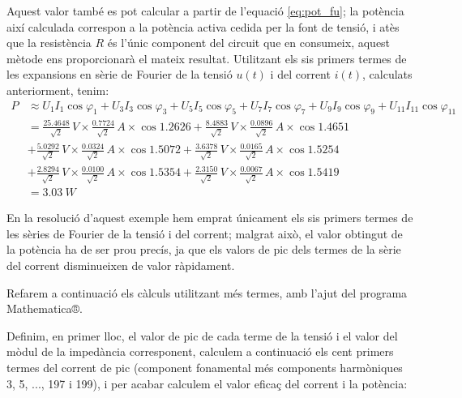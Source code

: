 \begin{exemple}
    Aquest valor també es pot calcular a partir de l'equació
    \eqref{eq:pot_fu}; la potència així calculada correspon a la
    potència activa cedida per la font de tensió, i atès que la
    resistència $R$ és l'únic component del circuit que en consumeix,
    aquest mètode ens proporcionarà el mateix resultat. Utilitzant els sis primers termes  de les
    expansions en sèrie de Fourier de la tensió $u(t)$ i del corrent
    $i(t)$, calculats anteriorment, tenim:
    \[\begin{split}
        P &\approx U_1 I_1 \cos\varphi_1 +  U_3 I_3 \cos\varphi_3 +
         U_5 I_5 \cos\varphi_5 + U_7 I_7 \cos\varphi_7 +
         U_9 I_9 \cos\varphi_9 + U_{11} I_{11} \cos\varphi_{11} \\[0.7ex]
        &= \frac{\num{25,4648}}{\sqrt{2}}\unit{\,V} \times
        \frac{\num{0,7724}}{\sqrt{2}}\unit{\,A} \times \cos \num{1,2626} +
        \frac{\num{8,4883}}{\sqrt{2}}\unit{\,V} \times
        \frac{\num{0,0896}}{\sqrt{2}}\unit{\,A} \times \cos \num{1,4651}  \\[0.7ex]
        &+ \frac{\num{5,0292}}{\sqrt{2}}\unit{\,V} \times
        \frac{\num{0,0324}}{\sqrt{2}}\unit{\,A} \times \cos \num{1,5072} +
        \frac{\num{3,6378}}{\sqrt{2}}\unit{\,V} \times
        \frac{\num{0,0165}}{\sqrt{2}}\unit{\,A} \times \cos \num{1,5254} \\[0.7ex]
        &+ \frac{\num{2,8294}}{\sqrt{2}}\unit{\,V} \times
        \frac{\num{0,0100}}{\sqrt{2}}\unit{\,A} \times \cos \num{1,5354} +
        \frac{\num{2,3150}}{\sqrt{2}}\unit{\,V} \times
        \frac{\num{0,0067}}{\sqrt{2}}\unit{\,A} \times \cos \num{1,5419}\\[0.7ex]
        &= \qty{3,03}{W}
    \end{split}\]

    En la resolució d'aquest exemple hem emprat únicament els sis
    primers termes de les sèries de Fourier de la tensió i del corrent;
    malgrat això, el valor  obtingut de la potència ha de ser prou precís, ja que
    els valors de pic dels termes de la sèrie del corrent disminueixen de
    valor ràpidament.

    Refarem a continuació els càlculs utilitzant més termes, amb l'ajut
    del programa
    Mathematica®.   

    Definim, en primer lloc, el valor de pic de cada
     terme de la tensió i el valor del mòdul de la impedància corresponent,
    calculem a continuació els cent primers termes  del corrent de pic (component fonamental més components harmòniques 3, 5, ..., 197 i 199), i
    per acabar calculem el valor eficaç del corrent i la potència:


\end{exemple}
